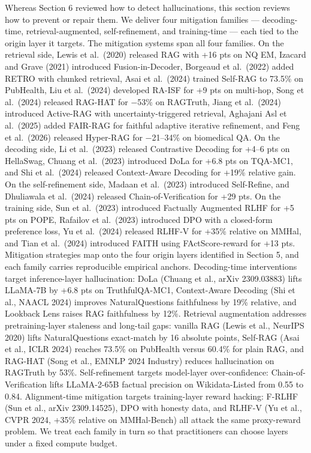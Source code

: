 \documentclass{article}
\begin{document}
Whereas Section 6 reviewed how to detect hallucinations, this section reviews how to prevent or repair them. We deliver four mitigation families --- decoding-time, retrieval-augmented, self-refinement, and training-time --- each tied to the origin layer it targets. The mitigation systems span all four families. On the retrieval side, Lewis et al.~(2020) released RAG with +16 pts on NQ EM, Izacard and Grave (2021) introduced Fusion-in-Decoder, Borgeaud et al.~(2022) added RETRO with chunked retrieval, Asai et al.~(2024) trained Self-RAG to 73.5\% on PubHealth, Liu et al.~(2024) developed RA-ISF for +9 pts on multi-hop, Song et al.~(2024) released RAG-HAT for −53\% on RAGTruth, Jiang et al.~(2024) introduced Active-RAG with uncertainty-triggered retrieval, Aghajani Asl et al.~(2025) added FAIR-RAG for faithful adaptive iterative refinement, and Feng et al.~(2026) released Hyper-RAG for −21--34\% on biomedical QA. On the decoding side, Li et al.~(2023) released Contrastive Decoding for +4--6 pts on HellaSwag, Chuang et al.~(2023) introduced DoLa for +6.8 pts on TQA-MC1, and Shi et al.~(2024) released Context-Aware Decoding for +19\% relative gain. On the self-refinement side, Madaan et al.~(2023) introduced Self-Refine, and Dhuliawala et al.~(2024) released Chain-of-Verification for +29 pts. On the training side, Sun et al.~(2023) introduced Factually Augmented RLHF for +5 pts on POPE, Rafailov et al.~(2023) introduced DPO with a closed-form preference loss, Yu et al.~(2024) released RLHF-V for +35\% relative on MMHal, and Tian et al.~(2024) introduced FAITH using FActScore-reward for +13 pts. Mitigation strategies map onto the four origin layers identified in Section 5, and each family carries reproducible empirical anchors. Decoding-time interventions target inference-layer hallucination: DoLa (Chuang et al., arXiv 2309.03883) lifts LLaMA-7B by +6.8 pts on TruthfulQA-MC1, Context-Aware Decoding (Shi et al., NAACL 2024) improves NaturalQuestions faithfulness by 19\% relative, and Lookback Lens raises RAG faithfulness by 12\%. Retrieval augmentation addresses pretraining-layer staleness and long-tail gaps: vanilla RAG (Lewis et al., NeurIPS 2020) lifts NaturalQuestions exact-match by 16 absolute points, Self-RAG (Asai et al., ICLR 2024) reaches 73.5\% on PubHealth versus 60.4\% for plain RAG, and RAG-HAT (Song et al., EMNLP 2024 Industry) reduces hallucination on RAGTruth by 53\%. Self-refinement targets model-layer over-confidence: Chain-of-Verification \citep{dhuliawala2024chainofverificatio} lifts LLaMA-2-65B factual precision on Wikidata-Listed from 0.55 to 0.84. Alignment-time mitigation targets training-layer reward hacking: F-RLHF (Sun et al., arXiv 2309.14525), DPO with honesty data, and RLHF-V (Yu et al., CVPR 2024, +35\% relative on MMHal-Bench) all attack the same proxy-reward problem. We treat each family in turn so that practitioners can choose layers under a fixed compute budget.
\end{document}

